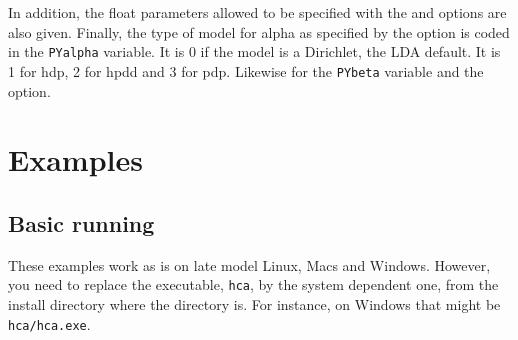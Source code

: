\documentclass[a4paper,english]{article}
\begin{document}
In addition, the float parameters allowed to be specified with the
 and  options are also given.
Finally, the type of model for alpha as specified by the
 option is coded in the
\texttt{PYalpha} variable. 
It is 0 if the model is a Dirichlet,
the LDA default.
It is 1 for hdp, 2 for hpdd and 3 for pdp.
Likewise for the \texttt{PYbeta} variable and the  option.


\section{Examples}

\subsection{Basic running}

These examples work as is on late model Linux, Macs and Windows.
However, you need to replace the executable,
\texttt{hca}, by the system dependent one,
from the install directory where the  directory is.
For instance, on Windows that might be \texttt{hca/hca.exe}.
\end{document}
